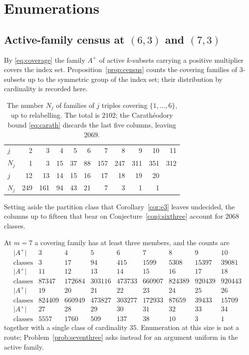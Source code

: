\section{Enumerations}\label{app:counts}

\subsection{Active-family census at
\texorpdfstring{$(6,3)$ and $(7,3)$}{(6,3) and (7,3)}}\label{app:census}

By \eqref{eq:coverage} the family $A^{+}$ of active $k$-subsets carrying a
positive multiplier covers the index set.  Proposition~\ref{prop:census}
counts the covering families of $3$-subsets up to the symmetric group of
the index set; their distribution by cardinality is recorded here.

\begin{table}[ht]
\small
\centering
\begin{tabular}{@{}l*{10}{r}@{}}
\toprule
$j$   & 2 & 3 & 4 & 5 & 6 & 7 & 8 & 9 & 10 & 11\\
$N_j$ & 1 & 3 & 15 & 37 & 88 & 157 & 247 & 311 & 351 & 312\\
\midrule
$j$   & 12 & 13 & 14 & 15 & 16 & 17 & 18 & 19 & 20 & \\
$N_j$ & 249 & 161 & 94 & 43 & 21 & 7 & 3 & 1 & 1 & \\
\bottomrule
\end{tabular}
\medskip
\caption{The number $N_j$ of families of $j$ triples covering
$\{1,\dots,6\}$, up to relabelling.  The total is $2102$; the
Carath\'eodory bound \eqref{eq:carath} discards the last five columns,
leaving $2069$.}
\label{tab:census}
\end{table}

Setting aside the partition class that Corollary~\ref{cor:e3} leaves
undecided, the columns up to fifteen that bear on
Conjecture~\ref{conj:sixthree} account for $2068$ classes.

At $m=7$ a covering family has at least three members, and the counts are
\[
\begin{array}{c|cccccccc}
\lvert A^{+}\rvert & 3&4&5&6&7&8&9&10\\ \hline
\text{classes} & 3&17&94&415&1599&5308&15397&39081\\[4pt]
\lvert A^{+}\rvert & 11&12&13&14&15&16&17&18\\ \hline
\text{classes} & 87347&172684&303116&473733&660907&824389&920439&920443\\[4pt]
\lvert A^{+}\rvert & 19&20&21&22&23&24&25&26\\ \hline
\text{classes} & 824409&660949&473827&303277&172933&87659&39433&15709\\[4pt]
\lvert A^{+}\rvert & 27&28&29&30&31&32&33&34\\ \hline
\text{classes} & 5557&1760&509&137&38&10&3&1
\end{array}
\]
together with a single class of cardinality $35$.  Enumeration at this
size is not a route; Problem~\ref{prob:seventhree} asks instead for an
argument uniform in the active family.
